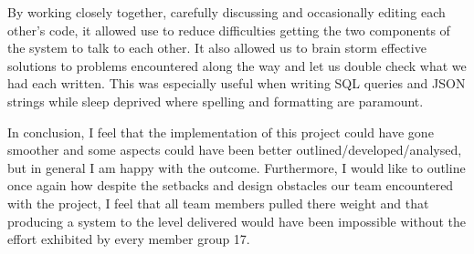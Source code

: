 \documentclass{article}
\begin{document}
By working closely together, carefully discussing and occasionally editing each other's code, it allowed use to reduce difficulties getting the two components of the system to talk to each other. It also allowed us to brain storm effective solutions to problems encountered along the way and let us double check what we had each written. This was especially useful when writing SQL queries and JSON strings while sleep deprived where spelling and formatting are paramount.

In conclusion, I feel that the implementation of this project could have gone smoother and some aspects could have been better outlined/developed/analysed, but in general I am happy with the outcome. Furthermore, I would like to outline once again how despite the setbacks and design obstacles our team encountered with the project, I feel that all team members pulled there weight and that producing a system to the level delivered would have been impossible without the effort exhibited by every member group 17.
\end{document}
